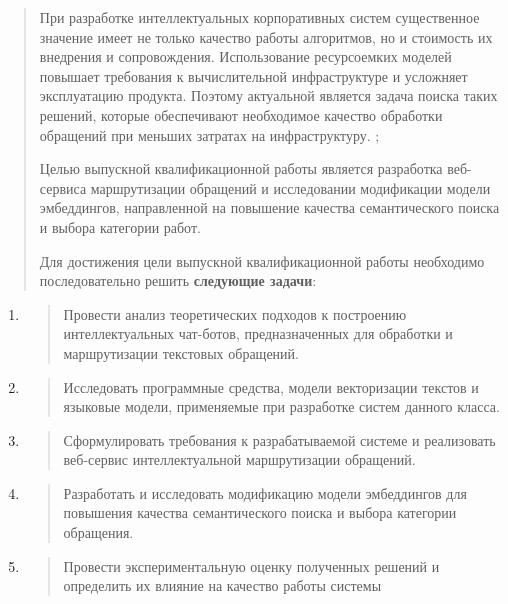 \begin{quote}
При разработке интеллектуальных корпоративных систем существенное
значение имеет не только качество работы алгоритмов, но и стоимость их
внедрения и сопровождения. Использование ресурсоемких моделей повышает
требования к вычислительной инфраструктуре и усложняет эксплуатацию
продукта. Поэтому актуальной является задача поиска таких решений,
которые обеспечивают необходимое качество обработки обращений при
меньших затратах на инфраструктуру. ;

Целью выпускной квалификационной работы является разработка веб-сервиса
маршрутизации обращений и исследовании модификации модели эмбеддингов,
направленной на повышение качества семантического поиска и выбора
категории работ.

Для достижения цели выпускной квалификационной работы необходимо
последовательно решить \textbf{следующие задачи}:
\end{quote}

\begin{enumerate}
\def\labelenumi{\arabic{enumi}.}
\item
  \begin{quote}
  Провести анализ теоретических подходов к построению интеллектуальных
  чат-ботов, предназначенных для обработки и маршрутизации текстовых
  обращений.
  \end{quote}
\item
  \begin{quote}
  Исследовать программные средства, модели векторизации текстов и
  языковые модели, применяемые при разработке систем данного класса.
  \end{quote}
\item
  \begin{quote}
  Сформулировать требования к разрабатываемой системе и реализовать
  веб-сервис интеллектуальной маршрутизации обращений.
  \end{quote}
\item
  \begin{quote}
  Разработать и исследовать модификацию модели эмбеддингов для повышения
  качества семантического поиска и выбора категории обращения.
  \end{quote}
\item
  \begin{quote}
  Провести экспериментальную оценку полученных решений и определить их
  влияние на качество работы системы
  \end{quote}
\end{enumerate}

